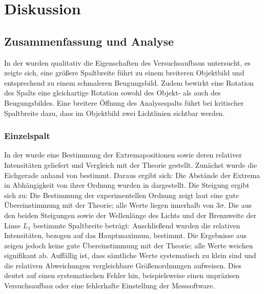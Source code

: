 \chapter{Diskussion}
\label{ch:diskussion}

\section{Zusammenfassung und Analyse}
\label{sec:zusammenfassung}

In der  wurden qualitativ die Eigenschaften des Versuchsaufbaus untersucht, es zeigte sich,
eine größere Spaltbreite führt zu einem breiteren Objektbild und entsprechend zu einem schmaleren Beugungsbild. Zudem bewirkt eine Rotation des Spalts eine gleichartige Rotation sowohl des Objekt- als auch des Beugungsbildes.
Eine breitere Öffnung des Analysespalts führt bei kritischer Spaltbreite dazu, dass im Objektbild zwei Lichtlinien sichtbar werden.

\subsection*{Einzelspalt}

In der  wurde eine Bestimmung der Extremapositionen sowie deren relativer Intensitäten geliefert und Vergleich mit der Theorie gestellt. 
Zunächst wurde die Eichgerade anhand von  bestimmt. Daraus ergibt sich:
Die Abstände der Extrema in Abhängigkeit von ihrer Ordnung wurden in  dargestellt. Die Steigung ergibt sich zu:
Die Bestimmung der experimentellen Ordnung zeigt laut  eine gute Übereinstimmung mit der Theorie; alle Werte liegen innerhalb von $3\sigma$.
Die aus den beiden Steigungen sowie der Wellenlänge des Lichts und der Brennweite der Linse $L_1$ bestimmte Spaltbreite beträgt:
Anschließend wurden die relativen Intensitäten, bezogen auf das Hauptmaximum, bestimmt. Die Ergebnisse aus  zeigen jedoch keine gute Übereinstimmung mit der Theorie; alle Werte weichen signifikant ab. Auffällig ist, dass sämtliche Werte systematisch zu klein sind und die relativen Abweichungen vergleichbare Größenordnungen aufweisen. Dies deutet auf einen systematischen Fehler hin, beispielsweise einen unpräzisen Versuchsaufbau oder eine fehlerhafte Einstellung der Messsoftware.

